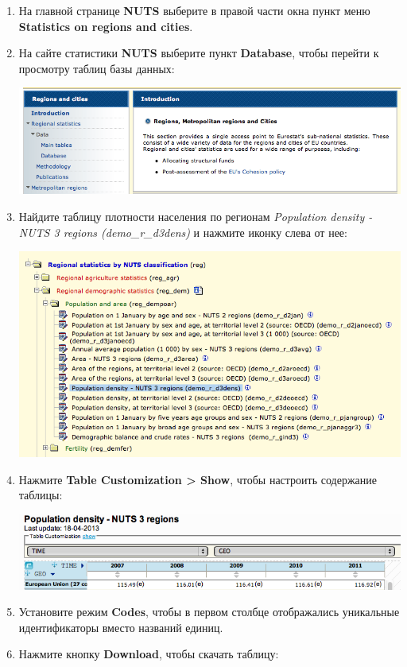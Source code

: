 \documentclass[]{book}
\theoremstyle{definition}
\theoremstyle{definition}
\theoremstyle{definition}
\theoremstyle{remark}
\begin{document}
\begin{enumerate}
\def\labelenumi{\arabic{enumi}.}
\item
  На главной странице \textbf{NUTS} выберите в правой части окна пункт
  меню \textbf{Statistics on regions and cities}.
\item
  На сайте статистики \textbf{NUTS} выберите пункт \textbf{Database},
  чтобы перейти к просмотру таблиц базы данных:

  \includegraphics{images/Ex08/image7.png}
\item
  Найдите таблицу плотности населения по регионам \emph{Population
  density - NUTS 3 regions (demo\_r\_d3dens)} и нажмите иконку слева от
  нее:

  \includegraphics{images/Ex08/image8.png}
\item
  Нажмите \textbf{Table Customization \textgreater{} Show}, чтобы
  настроить содержание таблицы:

  \includegraphics{images/Ex08/image9.png}
\item
  Установите режим \textbf{Codes}, чтобы в первом столбце отображались
  уникальные идентификаторы вместо названий единиц.
\item
  Нажмите кнопку \textbf{Download}, чтобы скачать таблицу:


\end{enumerate}
\end{document}
